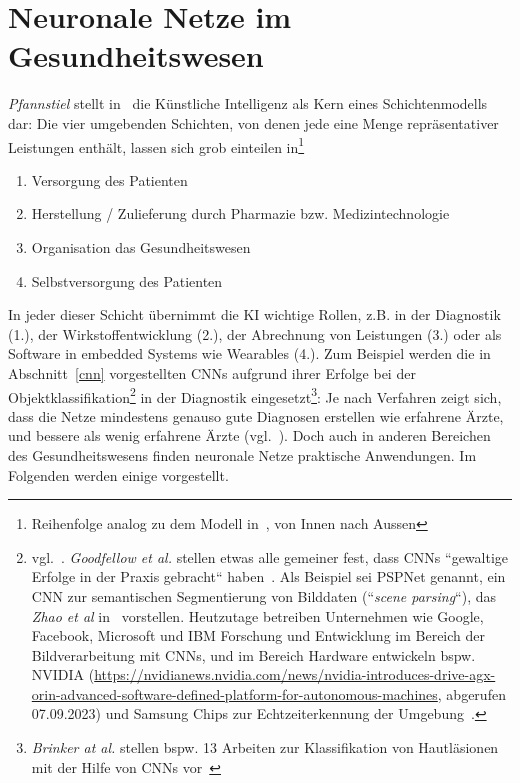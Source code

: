 \chapter{Neuronale Netze im Gesundheitswesen}\label{ch:gesundheitswesen}



\textit{Pfannstiel} stellt in~\cite[35, Abb. 1.14]{Pfa22} die Künstliche Intelligenz als Kern eines Schichtenmodells dar: Die vier umgebenden Schichten, von denen jede eine Menge repräsentativer Leistungen enthält, lassen sich grob einteilen in\footnote{
    Reihenfolge analog zu dem Modell in~\cite{Pfa22}, von Innen nach Aussen
}

\begin{enumerate}
    \item Versorgung des Patienten
    \item Herstellung / Zulieferung durch Pharmazie bzw. Medizintechnologie
    \item Organisation das Gesundheitswesen
    \item Selbstversorgung des Patienten
\end{enumerate}


In jeder dieser Schicht übernimmt die KI wichtige Rollen, z.B. in der Diagnostik (1.), der Wirkstoffentwicklung (2.), der Abrechnung von Leistungen (3.) oder als Software in embedded Systems wie Wearables (4.). Zum Beispiel werden die in Abschnitt~\ref{cnn} vorgestellten CNNs aufgrund ihrer Erfolge bei der Objektklassifikation\footnote{
    vgl.~\cite[330]{Ert21b}. \textit{Goodfellow et al.} stellen etwas alle gemeiner fest, dass CNNs ``gewaltige Erfolge in der Praxis gebracht`` haben~\cite[369]{GBC18}. Als Beispiel sei PSPNet genannt, ein CNN zur semantischen Segmentierung von Bilddaten (``\textit{scene parsing}``), das \textit{Zhao et al} in~\cite{ZSQ+17} vorstellen. Heutzutage betreiben Unternehmen wie Google, Facebook, Microsoft und IBM Forschung und Entwicklung im Bereich der Bildverarbeitung mit CNNs, und im Bereich Hardware entwickeln bspw. NVIDIA (\url{https://nvidianews.nvidia.com/news/nvidia-introduces-drive-agx-orin-advanced-software-defined-platform-for-autonomous-machines}, abgerufen 07.09.2023) und Samsung Chips zur Echtzeiterkennung der Umgebung~\cite[440]{LBH15}.
} in der Diagnostik eingesetzt\footnote{
    \textit{Brinker at al.} stellen bspw. 13 Arbeiten zur Klassifikation von Hautläsionen mit der Hilfe von CNNs vor~\cite{BHU+18}
}: Je nach Verfahren zeigt sich, dass die Netze mindestens genauso gute Diagnosen erstellen wie erfahrene Ärzte, und bessere als wenig erfahrene Ärzte (vgl.~\cite[7]{SZJ+19}). Doch auch in anderen Bereichen des Gesundheitswesens finden neuronale Netze praktische Anwendungen. Im Folgenden werden einige vorgestellt.



